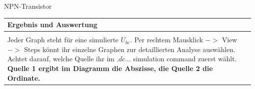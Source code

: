 \begin{frame}[t]{NPN-Transistor}
    \begin{spacing}{0.9} \begin{tiny}
      \begin{table}[h!]
        \begin{tabular}{p{10cm} }
          \hline
          \textbf{Ergebnis und Auswertung} \\
          \hline \\    
          Jeder Graph steht für eine simulierte $U_{be}$. Per rechtem Mausklick $->$ View $->$ Steps könnt ihr einzelne Graphen zur
          detaillierten Analyse auswählen. \newline\newline Achtet darauf, welche Quelle ihr im $.dc ...$ simulation command zuerst wählt. \textbf{Quelle 1 ergibt im Diagramm die Abszisse, die Quelle 2 die Ordinate.}
        \end{tabular}
      \end{table}
    \end{tiny} \end{spacing}
    
     \end{frame}